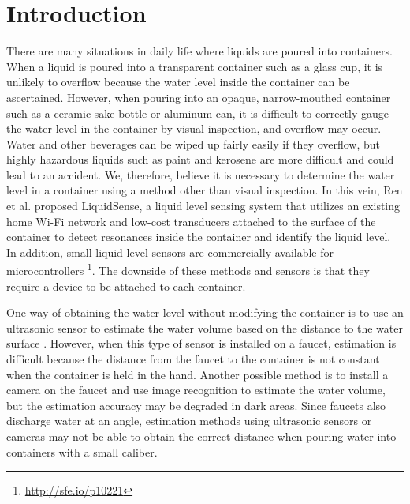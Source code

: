 \documentclass[manuscript,screen,anonymous,review]{acmart}
\begin{document}
\section{Introduction}
There are many situations in daily life where liquids are poured into containers. When a liquid is poured into a transparent container such as a glass cup, it is unlikely to overflow because the water level inside the container can be ascertained. However, when pouring into an opaque, narrow-mouthed container such as a ceramic sake bottle or aluminum can, it is difficult to correctly gauge the water level in the container by visual inspection, and overflow may occur. Water and other beverages can be wiped up fairly easily if they overflow, but highly hazardous liquids such as paint and kerosene are more difficult and could lead to an accident. We, therefore, believe it is necessary to determine the water level in a container using a method other than visual inspection. In this vein, Ren et al. \cite{LiquidSense} proposed LiquidSense, a liquid level sensing system that utilizes an existing home Wi-Fi network and low-cost transducers attached to the surface of the container to detect resonances inside the container and identify the liquid level. In addition, small liquid-level sensors are commercially available for microcontrollers \footnote{\url{http://sfe.io/p10221}}. The downside of these methods and sensors is that they require a device to be attached to each container.\par

One way of obtaining the water level without modifying the container is to use an ultrasonic sensor to estimate the water volume based on the distance to the water surface \cite{smart_faucet1}. However, when this type of sensor is installed on a faucet, estimation is difficult because the distance from the faucet to the container is not constant when the container is held in the hand. Another possible method is to install a camera on the faucet and use image recognition to estimate the water volume, but the estimation accuracy may be degraded in dark areas. Since faucets also discharge water at an angle, estimation methods using ultrasonic sensors or cameras may not be able to obtain the correct distance when pouring water into containers with a small caliber.\par
\end{document}
